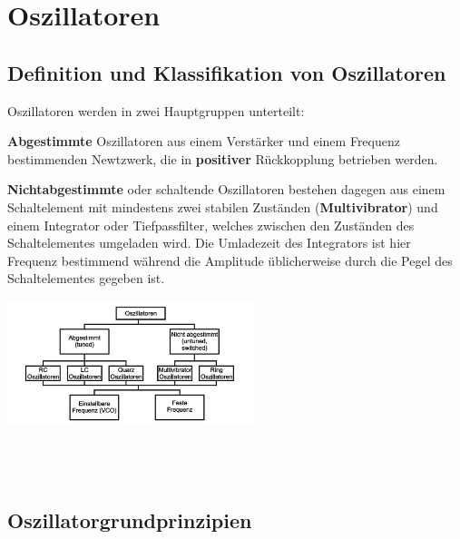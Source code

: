 \newpage
\section {Oszillatoren}
\subsection {Definition und Klassifikation von Oszillatoren} 
\raggedright

\begin{multicols}{2}
    Oszillatoren werden in zwei Hauptgruppen unterteilt:
    \begin{compactitem}
        \item \textbf{Abgestimmte} Oszillatoren aus einem Verstärker und einem Frequenz bestimmenden Newtzwerk, die in \textbf{positiver} Rückkopplung betrieben werden.
        \item \textbf{Nichtabgestimmte} oder schaltende Oszillatoren bestehen dagegen aus einem Schaltelement mit mindestens zwei stabilen Zuständen (\textbf{Multivibrator}) und einem Integrator oder Tiefpassfilter, welches zwischen den Zuständen des Schaltelementes umgeladen wird. Die Umladezeit des Integrators ist hier Frequenz bestimmend während die Amplitude üblicherweise durch die Pegel des Schaltelementes gegeben ist.
    \end{compactitem}
    
    \includegraphics[width=0.54\textwidth]{images/Klassifikation_Oszillatortypen}
    \ \\ \ \\ \ \\ \ \\
\end{multicols}

\FloatBarrier
\subsection{Oszillatorgrundprinzipien}
